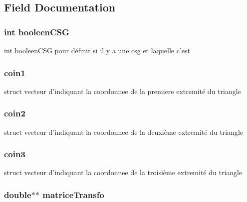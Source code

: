 \subsection{Field Documentation}
\hypertarget{structtriangle_a4428e32d4383f7dee25e5a4cb192da24}{
\subsubsection[{booleenCSG}]{\setlength{\rightskip}{0pt plus 5cm}int {\bf booleenCSG}}}
\label{structtriangle_a4428e32d4383f7dee25e5a4cb192da24}
int booleenCSG pour définir si il y a une csg et laquelle c'est \hypertarget{structtriangle_a9cc36100c63d0a9981e9a02f61382478}{
\subsubsection[{coin1}]{ {\bf coin1}}}
\label{structtriangle_a9cc36100c63d0a9981e9a02f61382478}
struct vecteur d'indiquant la coordonnee de la premiere extremité du triangle \hypertarget{structtriangle_a423cc79b02a928d7c839c23df7bd96d7}{
\subsubsection[{coin2}]{ {\bf coin2}}}
\label{structtriangle_a423cc79b02a928d7c839c23df7bd96d7}
struct vecteur d'indiquant la coordonnee de la deuxième extremité du triangle \hypertarget{structtriangle_a6b17f7821d0225a2203bbf488d8fe325}{
\subsubsection[{coin3}]{ {\bf coin3}}}
\label{structtriangle_a6b17f7821d0225a2203bbf488d8fe325}
struct vecteur d'indiquant la coordonnee de la troisième extremité du triangle \hypertarget{structtriangle_aa06ccc348007e3355beccf412f2f656c}{
\subsubsection[{matriceTransfo}]{\setlength{\rightskip}{0pt plus 5cm}double$\ast$$\ast$ {\bf matriceTransfo}}}
